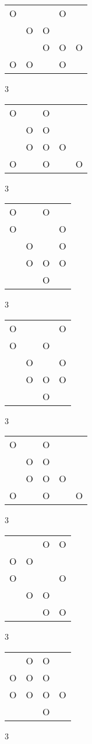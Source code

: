 \begin{tabular}{|m{0.2cm}m{0.2cm}m{0.2cm}m{0.2cm}m{0.2cm}|}\hline
O& & &O& \\
 &O&O& & \\
 & &O&O&O\\
O&O& &O& \\
\hline\end{tabular}3
\begin{tabular}{|m{0.2cm}m{0.2cm}m{0.2cm}m{0.2cm}m{0.2cm}|}\hline
O& &O& & \\
 &O&O& & \\
 &O&O&O& \\
O& &O& &O\\
\hline\end{tabular}3
\begin{tabular}{|m{0.2cm}m{0.2cm}m{0.2cm}m{0.2cm}|}\hline
O& &O& \\
O& & &O\\
 &O& &O\\
 &O&O&O\\
 & &O& \\
\hline\end{tabular}3
\begin{tabular}{|m{0.2cm}m{0.2cm}m{0.2cm}m{0.2cm}|}\hline
O& & &O\\
O& &O& \\
 &O& &O\\
 &O&O&O\\
 & &O& \\
\hline\end{tabular}3
\begin{tabular}{|m{0.2cm}m{0.2cm}m{0.2cm}m{0.2cm}m{0.2cm}|}\hline
O& &O& & \\
 &O&O& & \\
 &O&O&O& \\
O& &O& &O\\
\hline\end{tabular}3
\begin{tabular}{|m{0.2cm}m{0.2cm}m{0.2cm}m{0.2cm}|}\hline
 & &O&O\\
O&O& & \\
O& & &O\\
 &O&O& \\
 & &O&O\\
\hline\end{tabular}3
\begin{tabular}{|m{0.2cm}m{0.2cm}m{0.2cm}m{0.2cm}|}\hline
 &O&O& \\
O&O&O& \\
O&O&O&O\\
 & &O& \\
\hline\end{tabular}3
